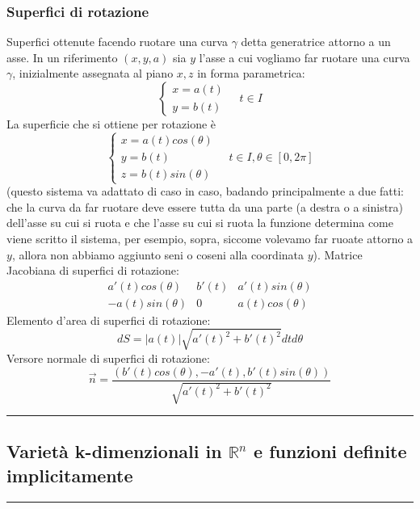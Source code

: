 \subsubsection*{Superfici di rotazione}
\begin{tcolorbox}
Superfici ottenute facendo ruotare una curva $\gamma$ detta generatrice attorno a un asse.\newline
In un riferimento $(x,y,a)$ sia $y$ l'asse a cui vogliamo far ruotare una curva $\gamma$, inizialmente assegnata al piano $x, z$ in forma parametrica:
\[
    \begin{cases}
        x = a(t)\\
        y = b(t)
    \end{cases} \quad t \in I
\]
La superficie che si ottiene per rotazione è
\[
    \begin{cases}
        x= a(t) cos(\theta)\\
        y = b(t)\\
        z= b(t) sin(\theta)
    \end{cases} \quad t \in I, \theta \in[0,2\pi]
\]
(questo sistema va adattato di caso in caso, badando principalmente a due fatti: che la curva da far ruotare deve essere tutta da una parte (a destra o a sinistra) dell'asse su cui si ruota e che l'asse su cui si ruota la funzione determina come viene scritto il sistema, per esempio, sopra, siccome volevamo far ruoate attorno a $y$, allora non abbiamo aggiunto seni o coseni alla coordinata $y$).\newline
Matrice Jacobiana di superfici di rotazione:
\[
    \begin{matrix}
        a'(t)cos(\theta) & b'(t) & a'(t)sin(\theta)\\
        -a(t)sin(\theta) & 0 & a(t) cos(\theta) 
    \end{matrix}
\]
Elemento d'area di superfici di rotazione:
\[
    dS = |a(t)|\sqrt{a'(t)^2 + b'(t)^2} dt d \theta
\]
Versore normale di superfici di rotazione:
\[
    \vec{n} = \frac{ (b'(t)cos(\theta), -a'(t), b'(t)sin(\theta))}{\sqrt{a'(t)^2 + b'(t)^2}}
\]
\end{tcolorbox}
\rule{\textwidth}{2pt}
\subsection*{Varietà k-dimenzionali in $\mathbb{R}^n$ e funzioni definite implicitamente}
\rule{\textwidth}{0,4pt}
